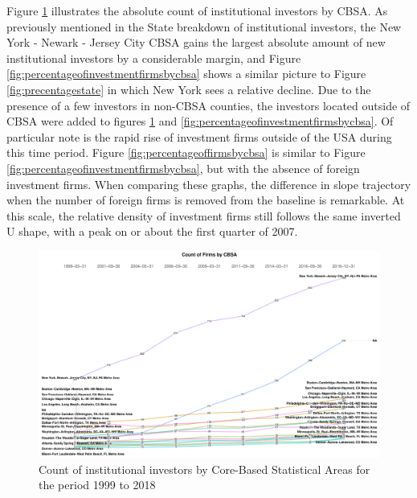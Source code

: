 Figure \ref{fig:countbycbsalegal} illustrates the absolute count of institutional investors by CBSA.  As previously mentioned in the State breakdown of institutional investors, the New York - Newark - Jersey City CBSA gains the largest absolute amount of new institutional investors by a considerable margin, and Figure \ref{fig:percentageofinvestmentfirmsbycbsa} shows a similar picture to Figure \ref{fig:precentagestate} in which New York sees a relative decline.  Due to the presence of a few investors in non-CBSA counties, the investors located outside of CBSA were added to figures \ref{fig:countbycbsalegal} and \ref{fig:percentageofinvestmentfirmsbycbsa}.  Of particular note is the rapid rise of investment firms outside of the USA during this time period.  Figure \ref{fig:percentageoffirmsbycbsa} is similar to Figure \ref{fig:percentageofinvestmentfirmsbycbsa}, but with the absence of foreign investment firms. When comparing these graphs, the difference in slope trajectory when the number of foreign firms is removed from the baseline is remarkable.   At this scale, the relative density of investment firms still follows the same inverted U shape, with a peak on or about the first quarter of 2007.  

\begin{figure}[h]
	\centering
	\includegraphics[width=1\linewidth]{Figures/ChapterIII/Count_by_CBSA_Legal}
	\caption[Count of Institutional Investors by CBSA]{Count of institutional investors by Core-Based Statistical Areas for the period 1999 to 2018}
	\label{fig:countbycbsalegal}
\end{figure}


